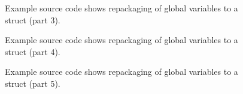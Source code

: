 \begin{figure}[!h]
{\indent
{\mySmallestFontSize


\begin{latexonly}
   
\end{latexonly}

\begin{htmlonly}
%   
\end{htmlonly}

}
}
\caption{Example source code shows repackaging of global variables to a struct (part 3).}
\label{Tutorial:exampleGlobalVariableHandling3}
\end{figure}

\begin{figure}[!h]
{\indent
{\mySmallestFontSize


\begin{latexonly}
   
\end{latexonly}

\begin{htmlonly}
%   
\end{htmlonly}

}
}
\caption{Example source code shows repackaging of global variables to a struct (part 4).}
\label{Tutorial:exampleGlobalVariableHandling4}
\end{figure}

\begin{figure}[!h]
{\indent
{\mySmallestFontSize


\begin{latexonly}
   
\end{latexonly}

\begin{htmlonly}
%   
\end{htmlonly}

}
}
\caption{Example source code shows repackaging of global variables to a struct (part 5).}
\label{Tutorial:exampleGlobalVariableHandling5}
\end{figure}

